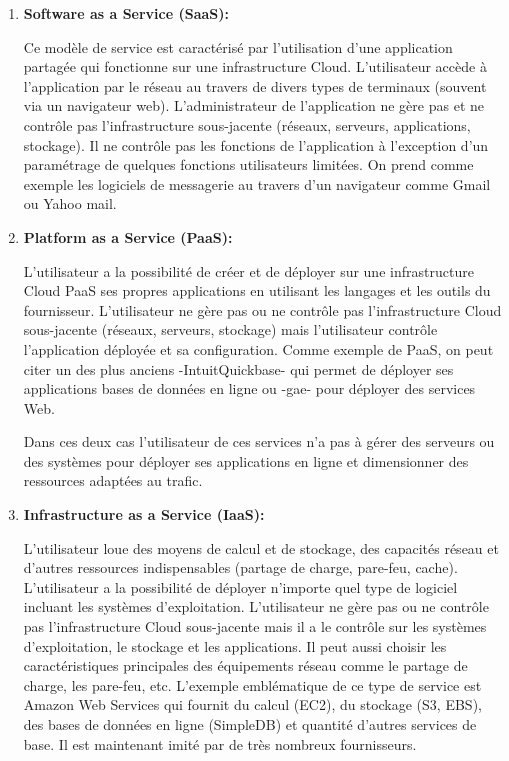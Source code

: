 \begin{enumerate}
\item 	\textbf{Software as a Service (SaaS):}

Ce modèle de service est caractérisé par l’utilisation d’une application partagée qui fonctionne sur une infrastructure Cloud. L’utilisateur accède à l’application par le réseau au travers de divers types de terminaux (souvent via un navigateur web). L’administrateur de l’application ne gère pas et ne contrôle pas l’infrastructure sous-jacente (réseaux, serveurs, applications, stockage).  Il ne contrôle pas les fonctions de l’application à l’exception d’un paramétrage de quelques fonctions utilisateurs limitées. On prend comme exemple les logiciels de messagerie au travers d’un navigateur comme Gmail ou Yahoo mail. 

\item  \textbf{ Platform as a Service (PaaS):}

L’utilisateur a la possibilité de créer et de déployer sur une infrastructure Cloud PaaS ses propres applications en utilisant les langages et les outils du fournisseur. L’utilisateur ne gère pas ou ne contrôle pas l’infrastructure Cloud sous-jacente (réseaux, serveurs, stockage) mais l’utilisateur contrôle l’application déployée et sa configuration. Comme exemple de PaaS, on peut citer un des plus anciens -IntuitQuickbase- qui permet de déployer ses applications bases de données en ligne ou -\ac{gae}- pour déployer des services Web. 

Dans ces deux cas l’utilisateur de ces services n’a pas à gérer des serveurs ou des systèmes pour déployer ses applications en ligne et dimensionner des ressources adaptées au trafic.
\item   \textbf{Infrastructure as a Service (IaaS):}

L’utilisateur loue des moyens de calcul et de stockage, des capacités réseau et d’autres ressources indispensables (partage de charge, pare-feu, cache). L’utilisateur a la possibilité de déployer n’importe quel type de logiciel incluant les systèmes d’exploitation. L’utilisateur ne gère pas ou ne contrôle pas l’infrastructure Cloud sous-jacente mais il a le contrôle sur les systèmes d’exploitation, le stockage et les applications. Il peut aussi choisir les caractéristiques principales des équipements réseau comme le partage de charge, les pare-feu, etc. L’exemple emblématique de ce type de service est Amazon Web Services qui fournit du calcul (EC2), du stockage (S3, EBS), des bases de données en ligne (SimpleDB) et quantité d’autres services de base. Il est maintenant imité par de très nombreux fournisseurs.
	  
\end{enumerate}
